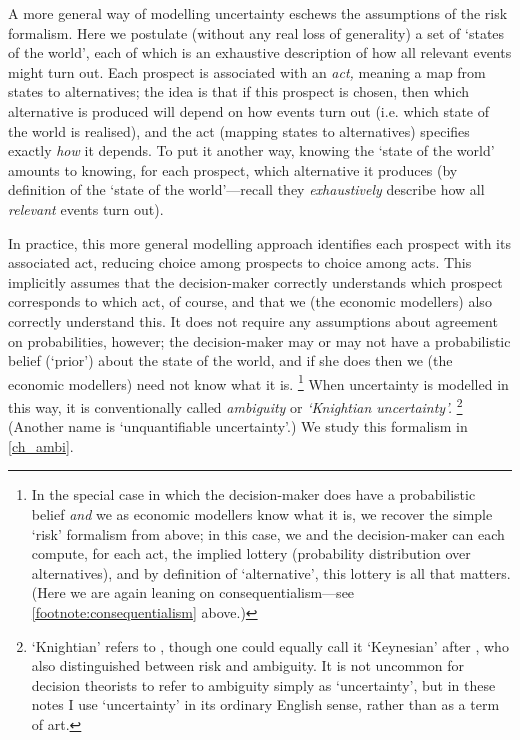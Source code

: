 \documentclass[11pt,letterpaper,reqno,oneside]{book}
\begin{document}
A more general way of modelling uncertainty eschews the assumptions of the risk formalism. Here we postulate (without any real loss of generality) a set of `states of the world', each of which is an exhaustive description of how all relevant events might turn out. Each prospect is associated with an \emph{act,} meaning a map from states to alternatives; the idea is that if this prospect is chosen, then which alternative is produced will depend on how events turn out (i.e. which state of the world is realised), and the act (mapping states to alternatives) specifies exactly \emph{how} it depends. To put it another way, knowing the `state of the world' amounts to knowing, for each prospect, which alternative it produces (by definition of the `state of the world'---recall they \emph{exhaustively} describe how all \emph{relevant} events turn out).

In practice, this more general modelling approach identifies each prospect with its associated act, reducing choice among prospects to choice among acts. This implicitly assumes that the decision-maker correctly understands which prospect corresponds to which act, of course, and that we (the economic modellers) also correctly understand this. It does not require any assumptions about agreement on probabilities, however; the decision-maker may or may not have a probabilistic belief (`prior') about the state of the world, and if she does then we (the economic modellers) need not know what it is.%
	\footnote{In the special case in which the decision-maker does have a probabilistic belief \emph{and} we as economic modellers know what it is, we recover the simple `risk' formalism from above; in this case, we and the decision-maker can each compute, for each act, the implied lottery (probability distribution over alternatives), and by definition of `alternative', this lottery is all that matters. (Here we are again leaning on consequentialism---see \cref{footnote:consequentialism} above.)}
When uncertainty is modelled in this way, it is conventionally called \emph{ambiguity} or \emph{`Knightian uncertainty'.}%
	\footnote{`Knightian' refers to \textcite{Knight1921}, though one could equally call it `Keynesian' after \textcite{Keynes1921}, who also distinguished between risk and ambiguity. It is not uncommon for decision theorists to refer to ambiguity simply as `uncertainty', but in these notes I use `uncertainty' in its ordinary English sense, rather than as a term of art.}
(Another name is `unquantifiable uncertainty'.)
We study this formalism in \cref{ch_ambi}.
\end{document}
